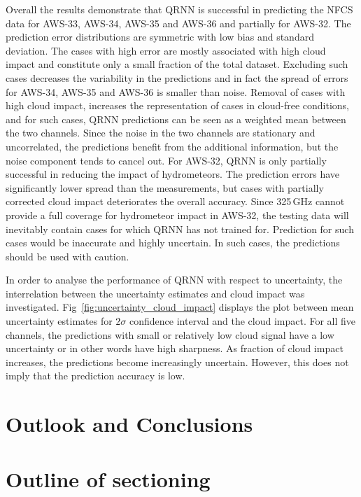 \documentclass[amt, manuscript]{copernicus}
\begin{document}
Overall the results demonstrate that QRNN is successful in predicting the NFCS data for AWS-33, AWS-34, AWS-35 and AWS-36 and partially for AWS-32. The prediction error distributions are symmetric with low bias and standard deviation. The cases with high error are mostly associated with high cloud impact and constitute only a small fraction of the total dataset. Excluding such cases decreases the variability in the predictions and in fact the spread of errors for AWS-34, AWS-35 and AWS-36 is smaller than noise. Removal of cases with high cloud impact, increases the representation of cases in cloud-free conditions, and for such cases, QRNN predictions can be seen as a weighted mean between the two channels. Since the noise in the two channels are stationary and uncorrelated, the predictions benefit from the additional information, but the noise component tends to cancel out. For AWS-32, QRNN is only partially successful in reducing the impact of hydrometeors. The prediction errors have significantly lower spread than the measurements, but cases with partially corrected cloud impact deteriorates the overall accuracy. Since 325\,GHz cannot provide a full coverage for hydrometeor impact in AWS-32, the testing data will inevitably contain cases for which QRNN has not trained for. Prediction for such cases would be inaccurate and highly uncertain. In such cases, the predictions should be used with caution. 

In order to analyse the performance of QRNN with respect to uncertainty, the interrelation between the uncertainty estimates and cloud impact was investigated. Fig~\ref{fig:uncertainty_cloud_impact} displays the plot between mean uncertainty estimates for $2\sigma$ confidence interval and the cloud impact. For all five channels, the predictions with small or relatively low cloud signal have a low uncertainty or in other words have high sharpness. As fraction of cloud impact increases, the predictions become increasingly uncertain. However, this does not imply that the prediction accuracy is low. 


\section{Outlook and Conclusions}  %



\newpage

\section*{Outline of sectioning}
\end{document}
